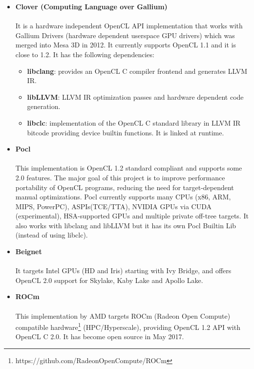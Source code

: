 \documentclass[12pt,a4paper,oneside]{article}
\begin{document}
\begin{itemize}
  \item \textbf{Clover (Computing Language over Gallium)}\\\\
  It is a hardware independent OpenCL API implementation that works with Gallium
  Drivers (hardware dependent userspace GPU drivers) which was merged into Mesa 3D
  in 2012. It currently supports OpenCL 1.1 and it is close to 1.2. It has the
  following dependencies:
    \begin{itemize}
      \item \textbf{libclang}: provides an OpenCL C compiler frontend and generates LLVM IR.
      \item \textbf{libLLVM}: LLVM IR optimization passes and hardware dependent code
      generation.
      \item \textbf{libclc}: implementation of the OpenCL C standard library in LLVM IR
      bitcode providing device builtin functions. It is linked at runtime.
    \end{itemize}
  \item \textbf{Pocl}\\\\
  This implementation is OpenCL 1.2 standard compliant and supports some 2.0
  features. The major goal of this project is to improve performance portability
  of OpenCL programs, reducing the need for target-dependent manual optimizations.
  Pocl currently supports many CPUs (x86, ARM, MIPS, PowerPC), ASPIs(TCE/TTA),
  NVIDIA GPUs via CUDA (experimental), HSA-supported GPUs and multiple private
  off-tree targets. It also works with libclang and libLLVM but it has its own
  Pocl Builtin Lib (instead of using libclc).
  \item \textbf{Beignet}\\\\
  It targets Intel GPUs (HD and Iris) starting with Ivy Bridge, and offers
  OpenCL 2.0 support for Skylake, Kaby Lake and Apollo Lake.
  \item \textbf{ROCm}\\\\
  This implementation by AMD targets ROCm (Radeon Open Compute) compatible
  hardware\footnote{https://github.com/RadeonOpenCompute/ROCm} (HPC/Hyperscale),
  providing OpenCL 1.2 API with OpenCL C 2.0. It has become open source in May
  2017.
\end{itemize}
\end{document}
